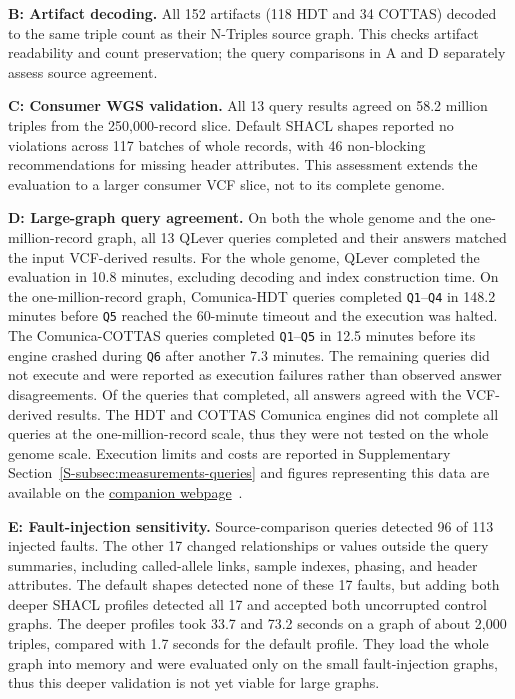 \documentclass[pdflatex,sn-mathphys-num,referee]{sn-jnl}
\begin{document}
\textbf{B: Artifact decoding.}
All 152 artifacts (118 HDT and 34 COTTAS) decoded to the same triple count as their N-Triples source graph.
This checks artifact readability and count preservation; the query comparisons in A and D separately assess source agreement.

\textbf{C: Consumer WGS validation.}
All 13 query results agreed on 58.2 million triples from the 250,000-record slice.
Default SHACL shapes reported no violations across 117 batches of whole records, with 46 non-blocking recommendations for missing header attributes.
This assessment extends the evaluation to a larger consumer VCF slice, not to its complete genome.

\textbf{D: Large-graph query agreement.}
On both the whole genome and the one-million-record graph, all 13 QLever queries completed and their answers matched the input VCF-derived results.
For the whole genome, QLever completed the evaluation in 10.8 minutes, excluding decoding and index construction time. 
On the one-million-record graph, Comunica-HDT queries completed \texttt{Q1}–\texttt{Q4} in 148.2 minutes before \texttt{Q5} reached the 60-minute timeout and the execution was halted.
The Comunica-COTTAS queries completed \texttt{Q1}–\texttt{Q5} in 12.5 minutes before its engine crashed during \texttt{Q6} after another 7.3 minutes. 
The remaining queries did not execute and were reported as execution failures rather than observed answer disagreements.
Of the queries that completed, all answers agreed with the VCF-derived results.
The HDT and COTTAS Comunica engines did not complete all queries at the one-million-record scale, thus they were not tested on the whole genome scale.
Execution limits and costs are reported in Supplementary Section~\ref{S-subsec:measurements-queries} and figures representing this data are available on the \href{https://ecrum19.github.io/vcf-rdfizer-testing/#rq1}{companion webpage}~\cite{vcfrdfizer_results_site}.

\textbf{E: Fault-injection sensitivity.}
Source-comparison queries detected 96 of 113 injected faults.
The other 17 changed relationships or values outside the query summaries, including called-allele links, sample indexes, phasing, and header attributes.
The default shapes detected none of these 17 faults, but adding both deeper SHACL profiles detected all 17 and accepted both uncorrupted control graphs.
The deeper profiles took 33.7 and 73.2 seconds on a graph of about 2,000 triples, compared with 1.7 seconds for the default profile.
They load the whole graph into memory and were evaluated only on the small fault-injection graphs, thus this deeper validation is not yet viable for large graphs.
\end{document}
